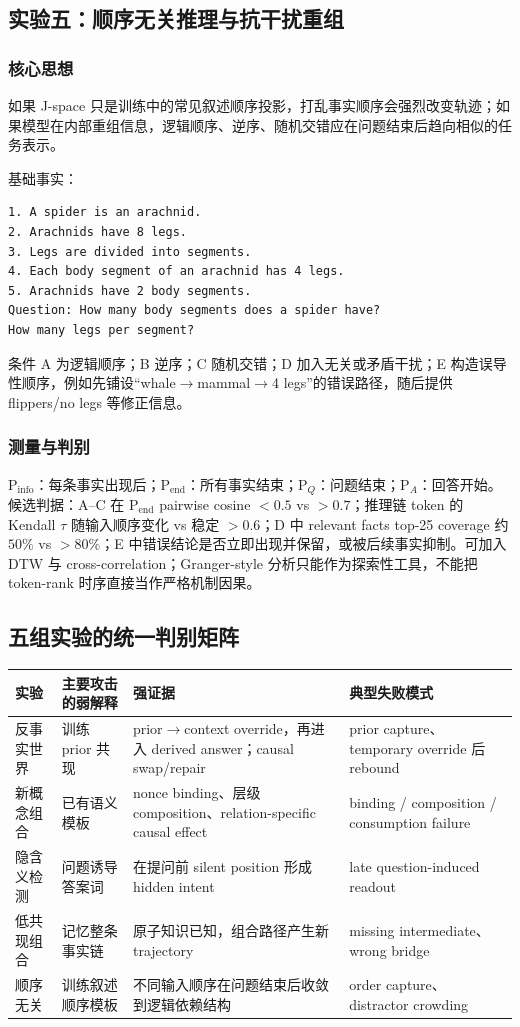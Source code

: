 \documentclass[10.5pt,a4paper]{ctexart}
\begin{document}
\subsection{实验五：顺序无关推理与抗干扰重组}
\subsubsection{核心思想}
如果 J-space 只是训练中的常见叙述顺序投影，打乱事实顺序会强烈改变轨迹；如果模型在内部重组信息，逻辑顺序、逆序、随机交错应在问题结束后趋向相似的任务表示。

基础事实：
\begin{lstlisting}
1. A spider is an arachnid.
2. Arachnids have 8 legs.
3. Legs are divided into segments.
4. Each body segment of an arachnid has 4 legs.
5. Arachnids have 2 body segments.
Question: How many body segments does a spider have?
How many legs per segment?
\end{lstlisting}
条件 A 为逻辑顺序；B 逆序；C 随机交错；D 加入无关或矛盾干扰；E 构造误导性顺序，例如先铺设“whale$\to$mammal$\to$4 legs”的错误路径，随后提供 flippers/no legs 等修正信息。

\subsubsection{测量与判别}
P$_{\mathrm{info}}$：每条事实出现后；P$_{\mathrm{end}}$：所有事实结束；P$_Q$：问题结束；P$_A$：回答开始。候选判据：A--C 在 P$_{\mathrm{end}}$ pairwise cosine $<0.5$ vs $>0.7$；推理链 token 的 Kendall $\tau$ 随输入顺序变化 vs 稳定 $>0.6$；D 中 relevant facts top-25 coverage 约 $50\%$ vs $>80\%$；E 中错误结论是否立即出现并保留，或被后续事实抑制。可加入 DTW 与 cross-correlation；Granger-style 分析只能作为探索性工具，不能把 token-rank 时序直接当作严格机制因果。

\subsection{五组实验的统一判别矩阵}
\begin{longtable}{p{}p{}p{}p{}}
\toprule
实验 & 主要攻击的弱解释 & 强证据 & 典型失败模式 \\
\midrule
反事实世界 & 训练 prior 共现 & prior$\to$context override，再进入 derived answer；causal swap/repair & prior capture、temporary override 后 rebound \\
新概念组合 & 已有语义模板 & nonce binding、层级 composition、relation-specific causal effect & binding / composition / consumption failure \\
隐含义检测 & 问题诱导答案词 & 在提问前 silent position 形成 hidden intent & late question-induced readout \\
低共现组合 & 记忆整条事实链 & 原子知识已知，组合路径产生新 trajectory & missing intermediate、wrong bridge \\
顺序无关 & 训练叙述顺序模板 & 不同输入顺序在问题结束后收敛到逻辑依赖结构 & order capture、distractor crowding \\
\bottomrule
\end{longtable}
\end{document}
